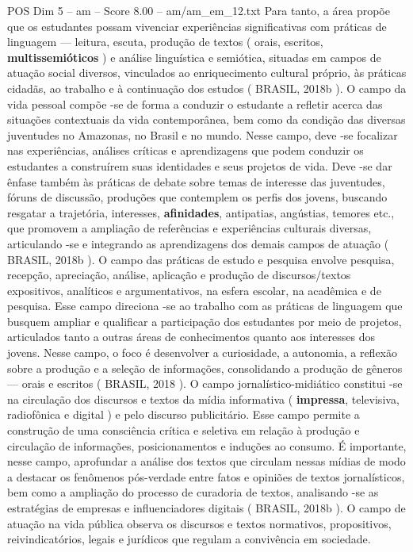 \begin{textsample}{POS Dim 5 – am – Score 8.00 – am/am\_em\_12.txt}
Para tanto, a área propõe que os estudantes possam vivenciar experiências significativas com práticas de linguagem — leitura, escuta, produção de textos ( orais, escritos, \textbf{multissemióticos} ) e análise linguística e semiótica, situadas em campos de atuação social diversos, vinculados ao enriquecimento cultural próprio, às práticas cidadãs, ao trabalho e à continuação dos estudos ( BRASIL, 2018b ).
O campo da vida pessoal compõe -se de forma a conduzir o estudante a refletir acerca das situações contextuais da vida contemporânea, bem como da condição das diversas juventudes no Amazonas, no Brasil e no mundo.
Nesse campo, deve -se focalizar nas experiências, análises críticas e aprendizagens que podem conduzir os estudantes a construírem suas identidades e seus projetos de vida.
Deve -se dar ênfase também às práticas de debate sobre temas de interesse das juventudes, fóruns de discussão, produções que contemplem os perfis dos jovens, buscando resgatar a trajetória, interesses, \textbf{afinidades}, antipatias, angústias, temores etc., que promovem a ampliação de referências e experiências culturais diversas, articulando -se e integrando as aprendizagens dos demais campos de atuação ( BRASIL, 2018b ).
O campo das práticas de estudo e pesquisa envolve pesquisa, recepção, apreciação, análise, aplicação e produção de discursos/textos expositivos, analíticos e argumentativos, na esfera escolar, na acadêmica e de pesquisa.
Esse campo direciona -se ao trabalho com as práticas de linguagem que busquem ampliar e qualificar a participação dos estudantes por meio de projetos, articulados tanto a outras áreas de conhecimentos quanto aos interesses dos jovens.
Nesse campo, o foco é desenvolver a curiosidade, a autonomia, a reflexão sobre a produção e a seleção de informações, consolidando a produção de gêneros — orais e escritos ( BRASIL, 2018 ).
O campo jornalístico-midiático constitui -se na circulação dos discursos e textos da mídia informativa ( \textbf{impressa}, televisiva, radiofônica e digital ) e pelo discurso publicitário.
Esse campo permite a construção de uma consciência crítica e seletiva em relação à produção e circulação de informações, posicionamentos e induções ao consumo.
É importante, nesse campo, aprofundar a análise dos textos que circulam nessas mídias de modo a destacar os fenômenos pós-verdade entre fatos e opiniões de textos jornalísticos, bem como a ampliação do processo de curadoria de textos, analisando -se as estratégias de empresas e influenciadores digitais ( BRASIL, 2018b ).
O campo de atuação na vida pública observa os discursos e textos normativos, propositivos, reivindicatórios, legais e jurídicos que regulam a convivência em sociedade.

\end{textsample}
